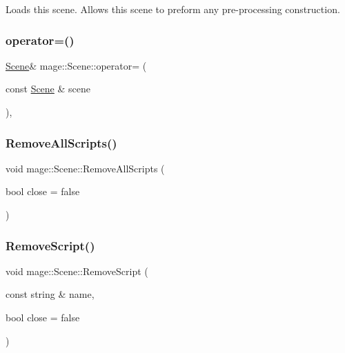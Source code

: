 Loads this scene. Allows this scene to preform any pre-\/processing construction. \hypertarget{classmage_1_1_scene_a2c25c0fedc0230771d8c00a8288a69ce}{}\label{classmage_1_1_scene_a2c25c0fedc0230771d8c00a8288a69ce} 
\subsubsection{\texorpdfstring{operator=()}{operator=()}}
{\footnotesize\ttfamily \hyperlink{classmage_1_1_scene}{Scene}\& mage\+::\+Scene\+::operator= (\begin{DoxyParamCaption}\item[{const \hyperlink{classmage_1_1_scene}{Scene} \&}]{scene }\end{DoxyParamCaption})\hspace{0.3cm}{\ttfamily [private]}, {\ttfamily [delete]}}

\hypertarget{classmage_1_1_scene_a283b7623f1f91e5b7ea53c3c938d6026}{}\label{classmage_1_1_scene_a283b7623f1f91e5b7ea53c3c938d6026} 
\subsubsection{\texorpdfstring{Remove\+All\+Scripts()}{RemoveAllScripts()}}
{\footnotesize\ttfamily void mage\+::\+Scene\+::\+Remove\+All\+Scripts (\begin{DoxyParamCaption}\item[{bool}]{close = {\ttfamily false} }\end{DoxyParamCaption})}

\hypertarget{classmage_1_1_scene_ad240957fb1b30254878cda8e20d7f7f4}{}\label{classmage_1_1_scene_ad240957fb1b30254878cda8e20d7f7f4} 
\subsubsection{\texorpdfstring{Remove\+Script()}{RemoveScript()}\hspace{0.1cm}{\footnotesize\ttfamily [1/2]}}
{\footnotesize\ttfamily void mage\+::\+Scene\+::\+Remove\+Script (\begin{DoxyParamCaption}\item[{const string \&}]{name,  }\item[{bool}]{close = {\ttfamily false} }\end{DoxyParamCaption})}

